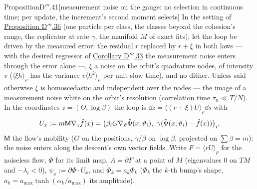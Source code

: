 \begin{thm}{Proposition}{D$'''$.41}[measurement noise on the gauge: no selection in continuous time; per update, the
increment's second moment selects]\label{res:thmDppp:41}%
In the setting of \hyperref[res:thmDppp:36]{Proposition D$'''$.36} (one particle per class, the classes beyond the
cohesion's range, the replicator at rate $\gamma$, the manifold $M$ of exact fits), let the loop be driven by the
measured error: the residual $r$ replaced by $r + \xi$ in both laws --- with the desired regressor of
\hyperref[res:thmDppp:33]{Corollary D$'''$.33} the measurement noise enters through the error alone ---, $\xi$ a noise
on the orbit's quadrature nodes, of intensity $v$ ($\langle\xi h\rangle_\rho$ has the variance $v\langle h^2\rangle_\rho$
per unit slow time), and no dither. Unless said otherwise $\xi$ is homoscedastic and independent over the nodes --- the
image of a measurement noise white on the orbit's resolution (correlation time $\tau_n\ll T/N$). In the coordinates
$z = (\Theta,\log\beta)$ the loop is $\dd z = \langle(r + \xi)U\rangle_\rho\dd s$ with
\[
  U_x := m\mathsf M\nabla_z\hat f(x) = \big(\beta_iG\nabla_\vartheta\tilde\Phi(x;\vartheta_i),\
  \gamma(\tilde\Phi(x;\vartheta_i) - \hat f(x))\big)_i,
\]
$\mathsf M$ the flow's mobility ($G$ on the positions, $\gamma/\beta$ on $\log\beta$, projected on $\sum\beta = m$): the
noise enters along the descent's own vector fields. Write $F = \langle rU\rangle_\rho$ for the noiseless flow, $\Phi$
for its limit map, $A = \partial F$ at a point of $M$ (eigenvalues 0 on $TM$ and $-\lambda_i < 0$),
$\psi_x := \partial\Phi\cdot U_x$, and $\tilde\Phi_k = a_k\Phi_k$ ($\Phi_k$ the $k$-th bump's shape,
$a_k = a_{\max}\tanh(\alpha_k/a_{\max})$ its amplitude).
\begin{enumerate}[label=\textup{(\roman*)}]

\end{enumerate}
\end{thm}
